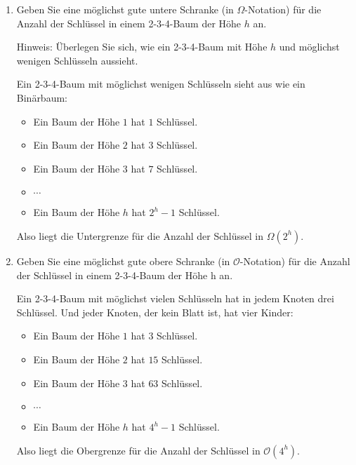 \documentclass{bschlangaul-aufgabe}
\begin{document}
\begin{enumerate}

\item Geben Sie eine möglichst gute untere Schranke (in
$\Omega$-Notation) für die Anzahl der Schlüssel in einem 2-3-4-Baum der
Höhe $h$ an.

Hinweis: Überlegen Sie sich, wie ein 2-3-4-Baum mit Höhe $h$ und
möglichst wenigen Schlüsseln aussieht.

\begin{liAntwort}
Ein 2-3-4-Baum mit möglichst wenigen Schlüsseln sieht aus wie ein
Binärbaum:

\begin{itemize}
\item Ein Baum der Höhe $1$ hat $1$ Schlüssel.
\item Ein Baum der Höhe $2$ hat $3$ Schlüssel.
\item Ein Baum der Höhe $3$ hat $7$ Schlüssel.
\item $\cdots$
\item Ein Baum der Höhe $h$ hat $2^h - 1$ Schlüssel.
\end{itemize}

Also liegt die Untergrenze für die Anzahl der Schlüssel in
$\Omega(2^h)$.
\end{liAntwort}


\item Geben Sie eine möglichst gute obere Schranke (in
$\mathcal{O}$-Notation) für die Anzahl der Schlüssel in einem 2-3-4-Baum
der Höhe h an.

\begin{liAntwort}
Ein 2-3-4-Baum mit möglichst vielen Schlüsseln hat in jedem Knoten drei
Schlüssel. Und jeder Knoten, der kein Blatt ist, hat vier Kinder:

\begin{itemize}
\item Ein Baum der Höhe $1$ hat $3$ Schlüssel.
\item Ein Baum der Höhe $2$ hat $15$ Schlüssel.
\item Ein Baum der Höhe $3$ hat $63$ Schlüssel.
\item $\cdots$
\item Ein Baum der Höhe $h$ hat $4^h - 1$ Schlüssel.
\end{itemize}

Also liegt die Obergrenze für die Anzahl der Schlüssel in
$\mathcal{O}(4^h)$.
\end{liAntwort}

\end{enumerate}
\end{document}
